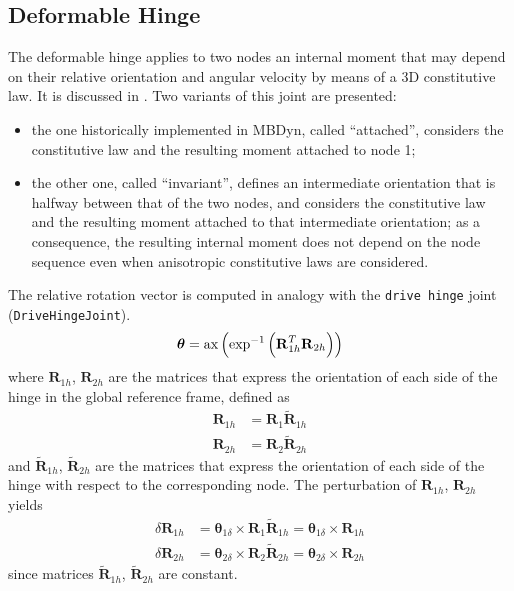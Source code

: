 \documentclass[10pt,dvips,fleqn,subeqn]{report}
\newcommand{\T}[1]{\bm{\mathbf{#1}}}
\begin{document}
\subsection{Deformable Hinge}
\label{sec:constraints:deformable:deformable hinge}
The deformable hinge applies to two nodes an internal moment that may depend
on their relative orientation and angular velocity by means 
of a 3D constitutive law.
It is discussed in \cite{INVJOINT}.
Two variants of this joint are presented:
\begin{itemize}
\item the one historically implemented in MBDyn, called ``attached'',
considers the constitutive law and the resulting moment attached to node 1;
\item the other one, called ``invariant'', defines an intermediate
orientation that is halfway between that of the two nodes, and considers
the constitutive law and the resulting moment attached to that intermediate
orientation; as a consequence, the resulting internal moment does not depend
on the node sequence even when anisotropic constitutive laws are considered.
\end{itemize}
The relative rotation vector is computed in analogy with the \texttt{drive hinge}
joint (\texttt{DriveHingeJoint}).
\begin{equation}
	\T{\theta} =
	\llk{ax}\plbr{\llk{exp}^{-1}\plbr{\T{R}_{1h}^T \T{R}_{2h}}}
\end{equation}
where $\T{R}_{1h}$, $\T{R}_{2h}$ are the matrices that express
the orientation of each side of the hinge in the global reference frame,
defined as
\begin{subequations}
\begin{align}
	\T{R}_{1h} &= \T{R}_{1} \tilde{\T{R}}_{1h} \\
	\T{R}_{2h} &= \T{R}_{2} \tilde{\T{R}}_{2h}
\end{align}
\end{subequations}
and $\tilde{\T{R}}_{1h}$, $\tilde{\T{R}}_{2h}$ are the matrices
that express the orientation of each side of the hinge with respect
to the corresponding node.
The perturbation of $\T{R}_{1h}$, $\T{R}_{2h}$ yields
\begin{subequations}
\begin{align}
	\delta \T{R}_{1h} &= \T{\theta}_{1\delta} \times \T{R}_{1} \tilde{\T{R}}_{1h}
		= \T{\theta}_{1\delta} \times \T{R}_{1h} \\
	\delta \T{R}_{2h} &= \T{\theta}_{2\delta} \times \T{R}_{2} \tilde{\T{R}}_{2h}
		= \T{\theta}_{2\delta} \times \T{R}_{2h}
\end{align}
\end{subequations}
since matrices $\tilde{\T{R}}_{1h}$, $\tilde{\T{R}}_{2h}$ are constant.
\end{document}
